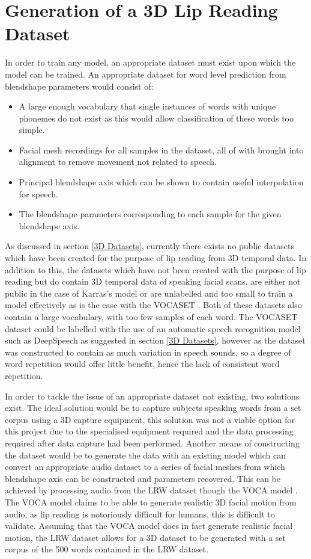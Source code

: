 \section{Generation of a 3D Lip Reading Dataset}
In order to train any model, an appropriate dataset must exist upon which the model can be trained.
An appropriate dataset for word level prediction from blendshape parameters would consist of:
\begin{itemize}
   \item A large enough vocabulary that single instances of words with unique phonemes do not exist as this would allow classification of these words too simple.
   \item Facial mesh recordings for all samples in the dataset, all of with brought into alignment to remove movement not related to speech.
   \item Principal blendshape axis which can be shown to contain useful interpolation for speech.
   \item The blendshape parameters corresponding to each sample for the given blendshape axis.
\end{itemize}

As discussed in section \ref{3D Datasets}, currently there exists no public datasets which have been created for the purpose of lip reading from 3D temporal data.
In addition to this, the datasets which have not been created with the purpose of lip reading but do contain 3D temporal data of speaking facial scans, are either not public in the case of Karras's model \cite{Karras2017a} or are unlabelled and too small to train a model effectively as is the case with the VOCASET \cite{Cudeiro2019}.
Both of these datasets also contain a large vocabulary, with too few samples of each word.
The VOCASET dataset could be labelled with the use of an automatic speech recognition model such as DeepSpeech as suggested in section \ref{3D Datasets}, however as the dataset was constructed to contain as much variation in speech sounds, so a degree of word repetition would offer little benefit, hence the lack of consistent word repetition.

In order to tackle the issue of an appropriate dataset not existing, two solutions exist.
The ideal solution would be to capture subjects speaking words from a set corpus using a 3D capture equipment, this solution was not a viable option for this project due to the specialised equipment required and the data processing required after data capture had been performed.
Another means of constructing the dataset would be to generate the data with an existing model which can convert an appropriate audio dataset to a series of facial meshes from which blendshape axis can be constructed and parameters recovered.
This can be achieved by processing audio from the LRW dataset \cite{Cheng2016} though the VOCA model \cite{Cudeiro2019}.
The VOCA model claims to be able to generate realistic 3D facial motion from audio, as lip reading is notoriously difficult for humans, this is difficult to validate.
Assuming that the VOCA model does in fact generate realistic facial motion, the LRW dataset allows for a 3D dataset to be generated with a set corpus of the 500 words contained in the LRW dataset.

